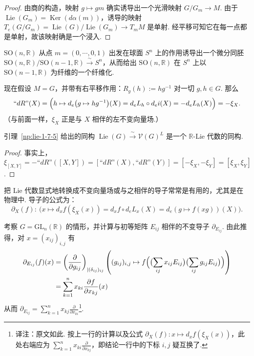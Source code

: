 \begin{proof}
由商的构造，映射 $g\mapsto gm$ 确实诱导出一个光滑映射 $G/G_{m}\longrightarrow M$. 由于 $\operatorname{Lie}(G_{m})=\operatorname{Ker}(d\alpha(m))$，诱导的映射 $T_{e}(G/G_{m})=\operatorname{Lie}(G)/\operatorname{Lie}(G_{m})\longrightarrow T_{m}M$ 是单射. 经平移可知它在每一点都是单射，故该映射确是一个浸入.
\end{proof}

\begin{example*}
$\mathrm{SO}(n,\mathbb R)$ 从点 $m=(0,\cdots,0,1)$ 出发在球面 $S^{n}$ 上的作用诱导出一个微分同胚 $\mathrm{SO}(n,\mathbb R)/\mathrm{SO}(n-1,\mathbb R)\xrightarrow{\ \sim\ }S^{n}$，从而给出 $\mathrm{SO}(n,\mathbb R)$ 在 $S^{n}$ 上以 $\mathrm{SO}(n-1,\mathbb R)$ 为纤维的一个纤维化.
\end{example*}

\begin{numpara}\label{np:lie-1-8-4}
现在假设 $M=G$，并带有右平移作用：$R_{g}(h):=hg^{-1}$ 对一切 $g,h\in G$. 那么
\[
\text{``}dR\text{''}(X)=\Bigl(h\mapsto d_{e}\bigl(g\mapsto hg^{-1}\bigr)(X)=d_{e}L_{h}\circ d_{e}i(X)=-d_{e}L_{h}(X)\Bigr)=-\xi_{X}.
\]
（与前面一样，$\xi_{X}$ 正是与 $X$ 相伴的左不变向量场.）
\end{numpara}

\begin{corollary*}
引理~\ref{np:lie-1-7-5} 给出的同构 $\operatorname{Lie}(G)\xrightarrow{\ \sim\ }\mathcal V(G)^{L}$ 是一个 $\mathbb R$-Lie 代数的同构.
\end{corollary*}

\begin{proof}
事实上，$\xi_{[X,Y]}=-\text{``}dR\text{''}([X,Y])=[\text{``}dR\text{''}(X),\text{``}dR\text{''}(Y)]=[-\xi_{X},-\xi_{Y}]=[\xi_{X},\xi_{Y}]$.
\end{proof}

把 Lie 代数显式地转换成不变向量场或与之相伴的导子常常是有用的，尤其是在物理中. 导子的公式为：
\[
\partial_{X}(f):\ \bigl(x\mapsto d_{x}f(\xi_{X}(x))=d_{x}f\circ d_{e}L_{x}(X)=d_{e}(g\mapsto f(xg))(X)\bigr).
\]
\begin{example*}
考察 $G=\mathrm{GL}_{n}(\mathbb R)$ 的情形，并计算与初等矩阵 $E_{ij}$ 相伴的不变导子 $\partial_{E_{ij}}$. 由此推得，对 $x=(x_{ij})_{i,j}$ 有
\begin{align*}
\partial_{E_{ij}}(f)(x)&=\left(\frac{\partial}{\partial g_{ij}}\right)_{|(\delta_{ij})_{ij}}\left((g_{ij})_{i,j}\mapsto f\Bigl(\bigl(\sum_{ij}x_{ij}E_{ij}\bigr)\bigl(\sum_{ij}g_{ij}E_{ij}\bigr)\Bigr)\right)\\
&=\sum_{k=1}^{n}x_{ki}\frac{\partial f}{\partial x_{kj}}(x)
\end{align*}
从而 $\partial_{E_{ij}}=\sum_{k=1}^{n}x_{kj}\frac{\partial}{\partial x_{ki}}$\footnote{译注：原文如此. 按上一行的计算以及公式 $\partial_{X}(f):x\mapsto d_{x}f(\xi_{X}(x))$，此处右端应为 $\sum_{k=1}^{n}x_{ki}\frac{\partial}{\partial x_{kj}}$，即结论一行中的下标 $i,j$ 疑互换了.}.
\end{example*}
